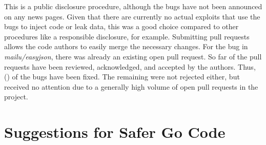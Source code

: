 

This is a public disclosure procedure, although the bugs have not been announced on any news pages.
Given that there are currently no actual exploits that use the bugs to inject code or leak data, this was a good choice
compared to other procedures like a responsible disclosure, for example.
Submitting \github{} pull requests allows the code authors to easily merge the necessary changes.
For the bug in \textit{mailu/easyjson}, there was already an existing open pull request.
So far \numberPRsMerged{} of the pull requests have been reviewed, acknowledged, and accepted by the authors.
Thus, \numberBugsMerged{} (\fractionBugsMerged{}) of the bugs have been fixed.
The remaining were not rejected either, but received no attention due to a generally high volume of open pull requests
in the project.



\section{Suggestions for Safer Go Code}\label{sec:discussion:safer-go-code}

